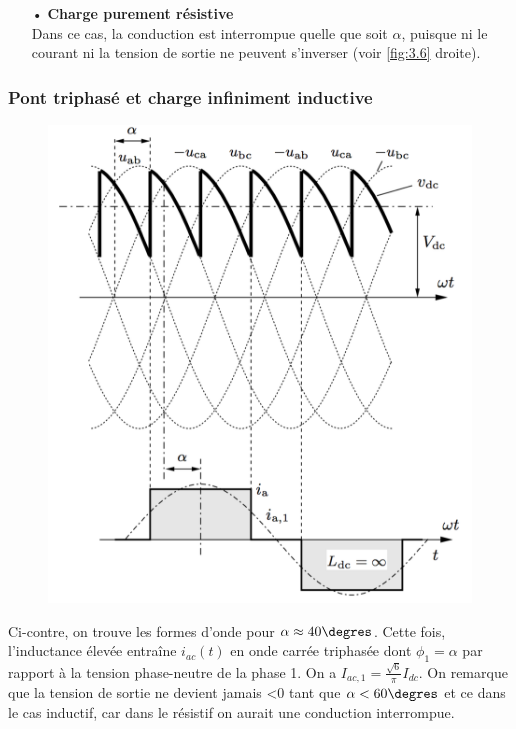 					\begin{itemize}
					\item[•] \textbf{Charge purement résistive}\\
					Dans ce cas, la conduction est interrompue quelle que soit $\alpha$, puisque ni le courant ni la tension de sortie ne peuvent s'inverser (voir \autoref{fig:3.6} droite). 
					\end{itemize}
					
				\subsubsection{Pont triphasé et charge infiniment inductive}
					\begin{figure}
					\vspace{-5mm}
					\includegraphics[scale=0.28]{ch3/7}
					\end{figure}
					Ci-contre, on trouve les formes d'onde pour $\alpha \approx 40\degres$. Cette fois, l'inductance élevée entraîne $i_{ac}(t)$ en onde carrée triphasée dont $\phi _1 = \alpha$ par rapport à la tension phase-neutre de la phase 1. On a $I_{ac,1} = \frac{\sqrt{6}}{\pi}I_{dc}$. On remarque que la tension de sortie ne devient jamais <0 tant que $\alpha < 60\degres$ et ce dans le cas inductif, car dans le résistif on aurait une conduction interrompue. 
					
